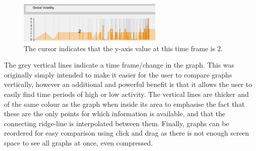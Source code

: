 \begin{figure}[H]
  \begin{center}
  \includegraphics[trim={5cm, 0, 9cm, 2cm},clip, width=70mm]{./Figures/margueriteGlobalVolatility.png}
  \caption{The cursor indicates that the y-axis value at this time frame is 2.}
  \label{fig:margueriteGlobalVolatilityAsExampleOfTracker}
  \end{center}
\end{figure}
The grey vertical lines indicate a time frame/change in the graph. This was originally simply intended to make it easier for the user to  compare graphs vertically, however an additional and powerful benefit is that it allows the user to  easily find time periods of high or low activity. The vertical lines are thicker and of the same colour as the graph when inside its area to emphasise the fact that these are the only points for which information is available, and that the connecting ridge-line is interpolated between them.
Finally, graphs can be reordered for easy comparison using click and drag as there is not enough screen space to see all graphs at once, even compressed.

